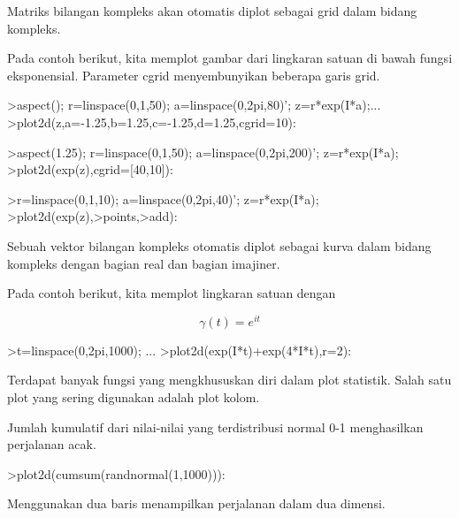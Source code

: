 \documentclass[a4paper,10pt]{article}
\begin{document}
\begin{eulernotebook}
\begin{eulercomment}
\begin{eulercomment}
\begin{eulercomment}
\begin{eulercomment}
\begin{eulercomment}
\begin{eulercomment}
\begin{eulercomment}
Matriks bilangan kompleks akan otomatis diplot sebagai grid dalam
bidang kompleks.

Pada contoh berikut, kita memplot gambar dari lingkaran satuan di
bawah fungsi eksponensial. Parameter cgrid menyembunyikan beberapa
garis grid.
\end{eulercomment}
\begin{eulerprompt}
>aspect(); r=linspace(0,1,50); a=linspace(0,2pi,80)'; z=r*exp(I*a);...
>plot2d(z,a=-1.25,b=1.25,c=-1.25,d=1.25,cgrid=10):
\end{eulerprompt}
\begin{eulerprompt}
>aspect(1.25); r=linspace(0,1,50); a=linspace(0,2pi,200)'; z=r*exp(I*a);
>plot2d(exp(z),cgrid=[40,10]):
\end{eulerprompt}
\begin{eulerprompt}
>r=linspace(0,1,10); a=linspace(0,2pi,40)'; z=r*exp(I*a);
>plot2d(exp(z),>points,>add):
\end{eulerprompt}
\begin{eulercomment}
Sebuah vektor bilangan kompleks otomatis diplot sebagai kurva dalam
bidang kompleks dengan bagian real dan bagian imajiner.

Pada contoh berikut, kita memplot lingkaran satuan dengan

\end{eulercomment}
\begin{eulerformula}
\[
\gamma(t) = e^{it}
\]
\end{eulerformula}
\begin{eulerprompt}
>t=linspace(0,2pi,1000); ...
>plot2d(exp(I*t)+exp(4*I*t),r=2):
\end{eulerprompt}
\begin{eulercomment}
Terdapat banyak fungsi yang mengkhususkan diri dalam plot statistik.
Salah satu plot yang sering digunakan adalah plot kolom.

Jumlah kumulatif dari nilai-nilai yang terdistribusi normal 0-1
menghasilkan perjalanan acak.
\end{eulercomment}
\begin{eulerprompt}
>plot2d(cumsum(randnormal(1,1000))):
\end{eulerprompt}
\begin{eulercomment}
Menggunakan dua baris menampilkan perjalanan dalam dua dimensi.



\end{eulercomment}
\end{eulercomment}
\end{eulercomment}
\end{eulercomment}
\end{eulercomment}
\end{eulercomment}
\end{eulercomment}
\end{eulernotebook}
\end{document}
